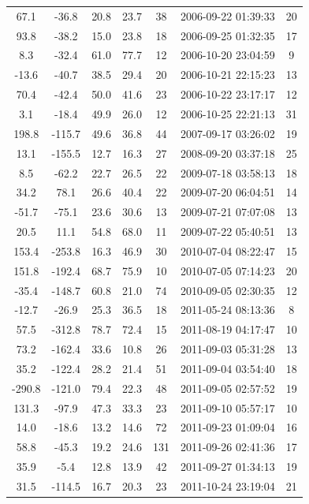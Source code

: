 \documentclass[12pt,a4paper]{report}
\begin{document}
\begin{longtable}{|c|c|c|c|c|c|c|}
67.1 & -36.8 & 20.8 & 23.7 &  38 & 2006-09-22 01:39:33 &  20 \\
93.8 & -38.2 & 15.0 & 23.8 &  18 & 2006-09-25 01:32:35 &  17 \\
8.3 & -32.4 & 61.0 & 77.7 &  12 & 2006-10-20 23:04:59 &   9 \\
-13.6 & -40.7 & 38.5 & 29.4 &  20 & 2006-10-21 22:15:23 &  13 \\
70.4 & -42.4 & 50.0 & 41.6 &  23 & 2006-10-22 23:17:17 &  12 \\
3.1 & -18.4 & 49.9 & 26.0 &  12 & 2006-10-25 22:21:13 &  31 \\
198.8 & -115.7 & 49.6 & 36.8 &  44 & 2007-09-17 03:26:02 &  19 \\
13.1 & -155.5 & 12.7 & 16.3 &  27 & 2008-09-20 03:37:18 &  25 \\
8.5 & -62.2 & 22.7 & 26.5 &  22 & 2009-07-18 03:58:13 &  18 \\
34.2 & 78.1 & 26.6 & 40.4 &  22 & 2009-07-20 06:04:51 &  14 \\
-51.7 & -75.1 & 23.6 & 30.6 &  13 & 2009-07-21 07:07:08 &  13 \\
20.5 & 11.1 & 54.8 & 68.0 &  11 & 2009-07-22 05:40:51 &  13 \\
153.4 & -253.8 & 16.3 & 46.9 &  30 & 2010-07-04 08:22:47 &  15 \\
151.8 & -192.4 & 68.7 & 75.9 &  10 & 2010-07-05 07:14:23 &  20 \\
-35.4 & -148.7 & 60.8 & 21.0 &  74 & 2010-09-05 02:30:35 &  12 \\
-12.7 & -26.9 & 25.3 & 36.5 &  18 & 2011-05-24 08:13:36 &   8 \\
57.5 & -312.8 & 78.7 & 72.4 &  15 & 2011-08-19 04:17:47 &  10 \\
73.2 & -162.4 & 33.6 & 10.8 &  26 & 2011-09-03 05:31:28 &  13 \\
35.2 & -122.4 & 28.2 & 21.4 &  51 & 2011-09-04 03:54:40 &  18 \\
-290.8 & -121.0 & 79.4 & 22.3 &  48 & 2011-09-05 02:57:52 &  19 \\
131.3 & -97.9 & 47.3 & 33.3 &  23 & 2011-09-10 05:57:17 &  10 \\
14.0 & -18.6 & 13.2 & 14.6 &  72 & 2011-09-23 01:09:04 &  16 \\
58.8 & -45.3 & 19.2 & 24.6 & 131 & 2011-09-26 02:41:36 &  17 \\
35.9 & -5.4 & 12.8 & 13.9 &  42 & 2011-09-27 01:34:13 &  19 \\
31.5 & -114.5 & 16.7 & 20.3 &  23 & 2011-10-24 23:19:04 &  21 \\

\end{longtable}
\end{document}
